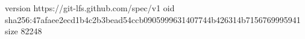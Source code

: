 version https://git-lfs.github.com/spec/v1
oid sha256:47afaee2ecd1b4c2b3bead54ccb0905999631407744b426314b7156769995941
size 82248
